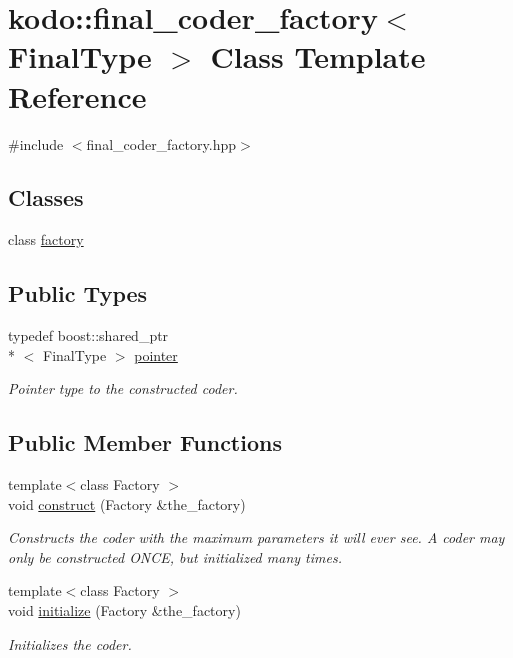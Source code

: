 \hypertarget{classkodo_1_1final__coder__factory}{\section{kodo\-:\-:final\-\_\-coder\-\_\-factory$<$ Final\-Type $>$ Class Template Reference}
\label{classkodo_1_1final__coder__factory}
}


{\ttfamily \#include $<$final\-\_\-coder\-\_\-factory.\-hpp$>$}

\subsection*{Classes}
\begin{DoxyCompactItemize}
\item 
class \hyperlink{classkodo_1_1final__coder__factory_1_1factory}{factory}
\end{DoxyCompactItemize}
\subsection*{Public Types}
\begin{DoxyCompactItemize}
\item 
\hypertarget{classkodo_1_1final__coder__factory_a24608d97861db353b6e425c01d9154bb}{typedef boost\-::shared\-\_\-ptr\\*
$<$ Final\-Type $>$ \hyperlink{classkodo_1_1final__coder__factory_a24608d97861db353b6e425c01d9154bb}{pointer}}\label{classkodo_1_1final__coder__factory_a24608d97861db353b6e425c01d9154bb}

\begin{DoxyCompactList}\small\item\em Pointer type to the constructed coder. \end{DoxyCompactList}\end{DoxyCompactItemize}
\subsection*{Public Member Functions}
\begin{DoxyCompactItemize}
\item 
{\footnotesize template$<$class Factory $>$ }\\void \hyperlink{classkodo_1_1final__coder__factory_a8f52498cf1f6796977edba47e77338bd}{construct} (Factory \&the\-\_\-factory)
\begin{DoxyCompactList}\small\item\em Constructs the coder with the maximum parameters it will ever see. A coder may only be constructed O\-N\-C\-E, but initialized many times. \end{DoxyCompactList}\item 
{\footnotesize template$<$class Factory $>$ }\\void \hyperlink{classkodo_1_1final__coder__factory_a36debbaf1cbc80d7e68291cee5d5c98d}{initialize} (Factory \&the\-\_\-factory)
\begin{DoxyCompactList}\small\item\em Initializes the coder. \end{DoxyCompactList}\end{DoxyCompactItemize}
